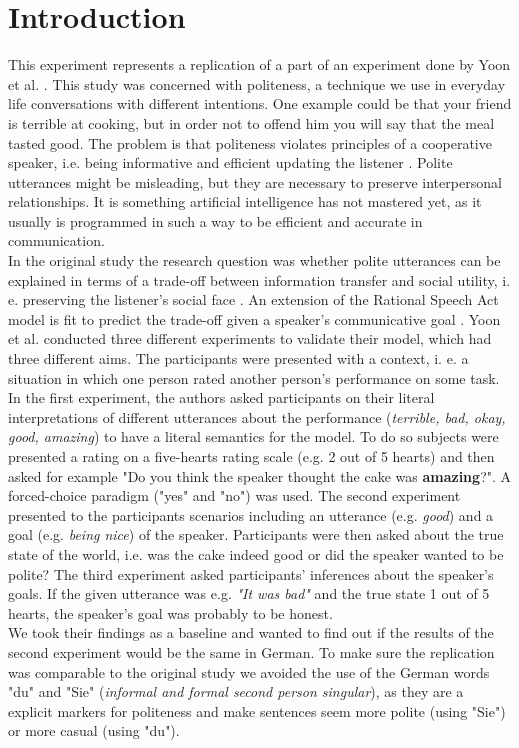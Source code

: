\documentclass[a4paper,11pt]{article}
\begin{document}
\section{Introduction}
This experiment represents a replication of a part of an experiment done by Yoon et al. \cite{yoon2016talking}. This study was concerned with politeness, a technique we use in everyday life conversations with different intentions. One example could be that your friend is terrible at cooking, but in order not to offend him you will say that the meal tasted good. The problem is that politeness violates principles of a cooperative speaker, i.e. being informative and efficient updating the listener \cite{grice1975logic}. Polite utterances might be misleading, but they are necessary to preserve interpersonal relationships. It is something artificial intelligence has not mastered yet, as it usually is programmed in such a way to be efficient and accurate in communication. \\ In the original study the research question was whether polite utterances can be explained in terms of a trade-off between information transfer and social utility, i. e. preserving the listener's social face \cite{brown1987politeness} . An extension of the Rational Speech Act model is fit to predict the trade-off given a speaker's communicative goal \cite{frank2012predicting}.  Yoon et al. \cite{yoon2016talking} conducted three different experiments to validate their model, which had three different aims. The participants were presented with a context, i. e. a situation in which one person rated another person's performance on some task. In the first experiment, the authors asked participants on their literal interpretations of different utterances about the performance (\textit{terrible, bad, okay, good, amazing}) to have a literal semantics for the model. To do so subjects were presented a rating on a five-hearts rating scale (e.g. 2 out of 5 hearts) and then asked for example "Do you think the speaker thought the cake was \textbf{amazing}?". A forced-choice paradigm ("yes" and "no") was used. The second experiment presented to the participants scenarios including an utterance (e.g. \textit{good}) and a goal (e.g. \textit{being nice}) of the speaker. Participants were then asked about the true state of the world, i.e. was the cake indeed good or did the speaker wanted to be polite? The third experiment asked participants' inferences about the speaker's goals. If the given utterance was e.g. \textit{"It was bad"} and the true state 1 out of 5 hearts, the speaker's goal was probably to be honest. \\ We took their findings as a baseline and wanted to find out if the results of the second experiment would be the same in German. To make sure the replication was comparable to the original study we avoided the use of the German words "du" and "Sie" (\textit{informal and formal second person singular}), as they are a explicit markers for politeness and make sentences seem more polite (using "Sie") or more casual (using "du"). 
\end{document}
